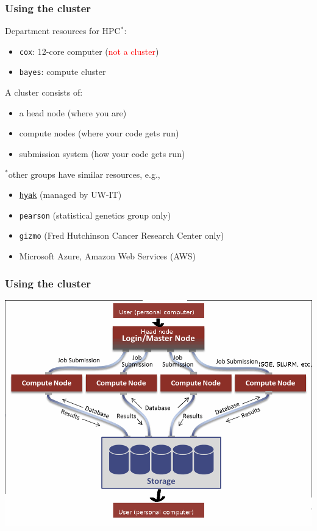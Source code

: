 \documentclass[12pt, 
hyperref={colorlinks=true, linkcolor=BlueViolet, urlcolor=BlueViolet},dvipsnames]{beamer}
\begin{document}
\begin{frame}
\frametitle{Using the cluster}
Department resources for HPC${}^*$: \vspace{-0.3cm} \pause
\begin{itemize}
\item \texttt{cox}: 12-core computer \pause (\textcolor{red}{not a cluster}) \pause
\item \texttt{bayes}: compute cluster
\end{itemize}

A cluster consists of: \vspace{-0.3cm} \pause
\begin{itemize}
\item a head node \pause (where you are) \pause
\item compute nodes \pause (where your code gets run) \pause
\item submission system \pause (how your code gets run) \pause
\end{itemize}

{\small ${}^*$other groups have similar resources, e.g., \vspace{-0.3cm}
\begin{itemize}
\item \href{https://itconnect.uw.edu/service/shared-scalable-compute-cluster-for-research-hyak/}{\texttt{hyak}} (managed by UW-IT)
\item \texttt{pearson} (statistical genetics group only)
\item \texttt{gizmo} (Fred Hutchinson Cancer Research Center only)
\item Microsoft Azure, Amazon Web Services (AWS)
\end{itemize}
}
\end{frame}

\begin{frame}
\frametitle{Using the cluster}
\begin{center}
\includegraphics[width = 1\textwidth]{plots/hpc_system.png}
\end{center}
\end{frame}
\end{document}
